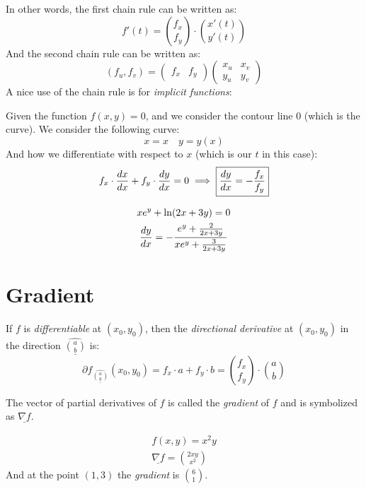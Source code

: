 \documentclass[00_complete]{subfiles}
\begin{document}
In other words, the first chain rule can be written as:
$$f'(t)=\binom{f_x}{f_y}\cdot\binom{x'(t)}{y'(t)}$$
And the second chain rule can be written as:
$$(f_u,f_v)=\begin{pmatrix}f_x&f_y\end{pmatrix}
\begin{pmatrix}x_u&x_v\\y_u&y_v\end{pmatrix}$$
A nice use of the chain rule is for \emph{implicit functions}:

Given the function $f(x,y)=0$, and we consider the contour line $0$ (which is the
curve). We consider the following curve:
$$x=x \quad y=y(x)$$
And how we differentiate with respect to $x$ (which is our $t$ in this case):
$$f_x\cdot \dv{x}{x} + f_y\cdot \dv{y}{x}=0 \implies
\boxed{\dv{y}{x}=-\frac{f_x}{f_y}}$$
\begin{example}
    \begin{gather*}
    xe^y+\ln(2x+3y)=0 \\
    \dv{y}{x} = -\frac{e^y+\frac{2}{2x+3y}}{xe^y+\frac{3}{2x+3y}}
    \end{gather*}
\end{example}
\section{Gradient}
\begin{reminder}
    If $f$ is \emph{differentiable} at $(x_0,y_0)$, then the \emph{directional
    derivative} at $(x_0,y_0)$ in the direction $\hat{\underline{\binom{a}{b}}}$
    is:
    $$\partial f_{\hat{\underline{\binom{a}{b}}}}(x_0,y_0)=f_x\cdot a +
    f_y\cdot b = \binom{f_x}{f_y}\cdot\binom{a}{b}$$
\end{reminder}
\begin{definition}[Gradient]
    The vector of partial derivatives of $f$ is called the \emph{gradient} of
    $f$ and is symbolized as $\underline {\nabla f}$.
\end{definition}
\begin{example}
    \begin{gather*}
        f(x,y)=x^2y \\
        \underline{\nabla f} = \binom{2xy}{x^2}
    \end{gather*}
    And at the point $(1,3)$ the \emph{gradient} is $\binom{6}{1}$.
\end{example}
\end{document}
